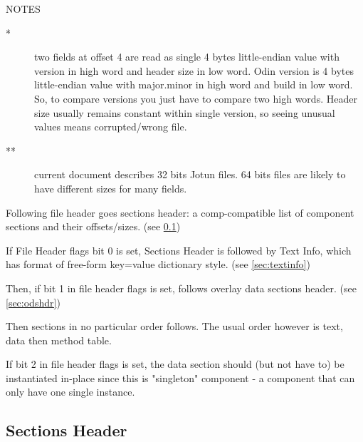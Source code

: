 \documentclass[onecolumn]{article}
\begin{document}
\par NOTES
\begin{description}
\item[ * ] two fields at offset 4 are read as single 4 bytes little-endian
value with version in high word and header size in low word. Odin version
is 4 bytes little-endian value with major.minor in high word and build in
low word. So, to compare versions you just have to compare two high words.
Header size usually remains constant within single version, so seeing unusual
values means corrupted/wrong file.
\item[ ** ] current document describes 32 bits Jotun files. 64 bits files are likely to
have different sizes for many fields.
\end{description}

\par Following file header goes sections header: a comp-compatible list of
component sections and their offsets/sizes. (see \ref{sec:secthdr})

\par If File Header flags bit 0 is set, Sections Header is followed by Text Info,
which has format of free-form key=value dictionary style. (see \ref{sec:textinfo})

\par Then, if bit 1 in file header flags is set, follows overlay data sections header. (see \ref{sec:odshdr})

\par Then sections in no particular order follows. The usual order however is
text, data then method table.

\par If bit 2 in file header flags is set, the data section should (but not have to) be
instantiated in-place since this is "singleton" component - a component that can only
have one single instance.


\subsection{Sections Header}
\label{sec:secthdr}
\end{document}
